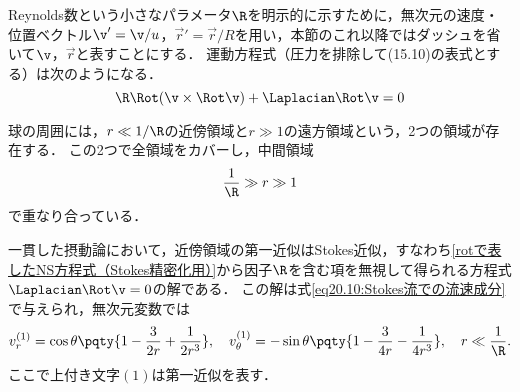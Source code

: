 Reynolds数という小さなパラメータ$\R$を明示的に示すために，無次元の速度・位置ベクトル$\v '= \v/u$，$\vec{r}'=\vec{r}/R$を用い，本節のこれ以降ではダッシュを省いて$\v$，$\vec{r}$と表すことにする．
運動方程式（圧力を排除して(15.10)の表式とする）は次のようになる．
\begin{equation}\label{rotで表したNS方程式（Stokes精密化用）}
    \R \Rot(\v\times\Rot\v) + \Laplacian\Rot\v = 0
\end{equation}


球の周囲には，$r \ll 1/\R$の近傍領域と$r \gg 1$の遠方領域という，2つの領域が存在する．
この2つで全領域をカバーし，中間領域
\begin{equation}\label{Stokes流の中間領域}
    \frac{1}{\R} \gg r \gg 1
\end{equation}
で重なり合っている．


一貫した摂動論において，近傍領域の第一近似はStokes近似，すなわち\eqref{rotで表したNS方程式（Stokes精密化用）}から因子$\R$を含む項を無視して得られる方程式$\Laplacian\Rot\v=0$の解である．
この解は式\eqref{eq20.10:Stokes流での流速成分}で与えられ，無次元変数では
\begin{equation}\label{無次元化した，Stokes流の流速成分}
    v_r^{(1)} = \cos\theta \pqty{ 1-\frac{3}{2r}+\frac{1}{2r^3} }, \quad
    v_{\theta}^{(1)} = -\sin\theta \pqty{ 1-\frac{3}{4r}-\frac{1}{4r^3} }, \quad 
    r \ll \frac{1}{\R} .
\end{equation}
ここで上付き文字$(1)$は第一近似を表す．



